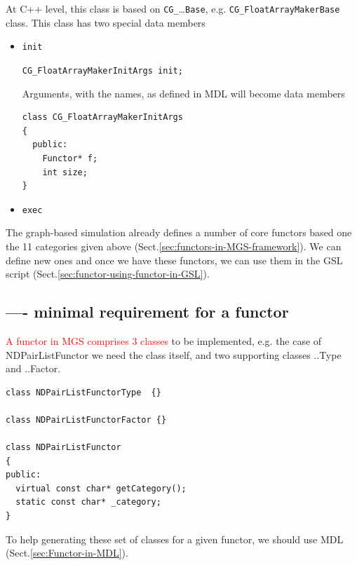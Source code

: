 At C++ level, this class is based on \verb!CG_!\ldots\verb!Base!, e.g.
\verb!CG_FloatArrayMakerBase! class. This class has two special data members
\begin{itemize}
  \item \verb!init!

\verb!CG_FloatArrayMakerInitArgs init;! 
  
Arguments, with the names, as defined in MDL will become data members 

\begin{verbatim}
class CG_FloatArrayMakerInitArgs 
{
  public:
    Functor* f;  
    int size;
}
\end{verbatim}  
  
  \item \verb!exec!
\end{itemize}


The graph-based simulation already defines a number of core functors based one
the 11 categories given above (Sect.\ref{sec:functors-in-MGS-framework}).
We can define new ones and once we have these functors, we can use them in the
GSL script (Sect.\ref{sec:functor-using-functor-in-GSL}).

\subsection{---- minimal requirement for a functor}
\label{sec:functor-minimal-requirement}

\textcolor{red}{A functor in MGS comprises 3 classes} to be
implemented, e.g. the case of NDPairListFunctor we need the class itself, and
two supporting classes ..Type and ..Factor.

\begin{verbatim}
class NDPairListFunctorType  {}

class NDPairListFunctorFactor {}

class NDPairListFunctor
{
public: 
  virtual const char* getCategory();
  static const char* _category;
}
\end{verbatim}

To help generating these set of classes for a given functor, we should use MDL
(Sect.\ref{sec:Functor-in-MDL}).


% 

